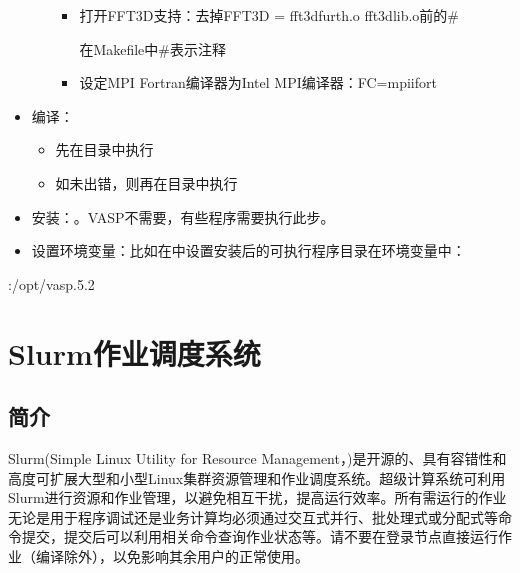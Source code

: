 \documentclass[a4paper,12pt,english]{sphinxmanual}
\begin{document}
\begin{itemize}
\begin{itemize}
\begin{itemize}
\item {} 
\sphinxAtStartPar
打开FFT3D支持：去掉FFT3D = fft3dfurth.o fft3dlib.o前的\# %
\begin{footnote}[5]\sphinxAtStartFootnote
在Makefile中\#表示注释
%
\end{footnote}

\item {} 
\sphinxAtStartPar
设定MPI Fortran编译器为Intel MPI编译器：FC=mpiifort

\end{itemize}

\end{itemize}

\item {} 
\sphinxAtStartPar
编译：
\begin{itemize}
\item {} 
\sphinxAtStartPar
先在目录中执行

\item {} 
\sphinxAtStartPar
如未出错，则再在目录中执行

\end{itemize}

\item {} 
\sphinxAtStartPar
安装：。VASP不需要，有些程序需要执行此步。

\item {} 
\sphinxAtStartPar
设置环境变量：比如在中设置安装后的可执行程序目录在环境变量中：

\end{itemize}

\begin{sphinxVerbatim}[commandchars=\\\{\}]
 :/opt/vasp.5.2
\end{sphinxVerbatim}

\sphinxstepscope


\chapter{Slurm作业调度系统}
\label{\detokenize{slurm/index:slurm}}\label{\detokenize{slurm/index::doc}}
\sphinxstepscope


\section{简介}
\label{\detokenize{slurm/slurm:id1}}\label{\detokenize{slurm/slurm::doc}}
\sphinxAtStartPar
Slurm(Simple Linux Utility for Resource Management，)是开源的、具有容错性和高度可扩展大型和小型Linux集群资源管理和作业调度系统。超级计算系统可利用Slurm进行资源和作业管理，以避免相互干扰，提高运行效率。所有需运行的作业无论是用于程序调试还是业务计算均必须通过交互式并行、批处理式或分配式等命令提交，提交后可以利用相关命令查询作业状态等。请不要在登录节点直接运行作业（编译除外），以免影响其余用户的正常使用。
\end{document}

